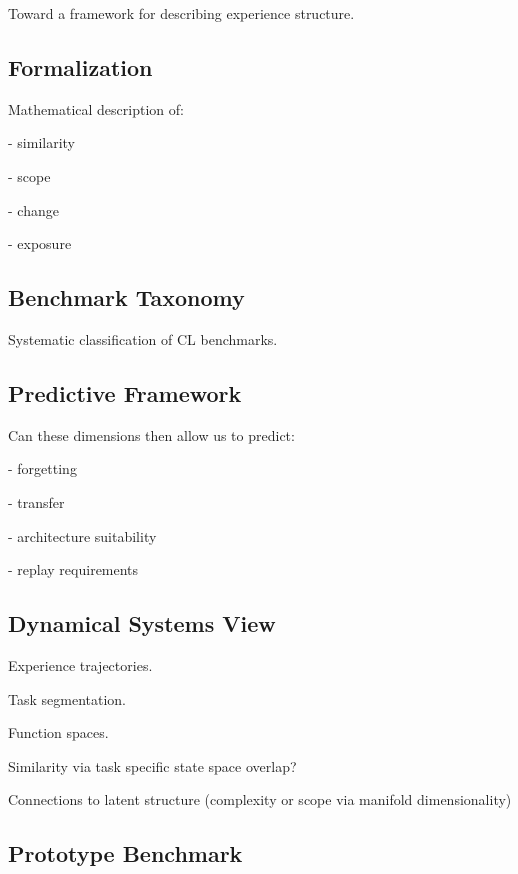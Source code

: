 \documentclass{article}
\begin{document}
        Toward a framework for describing experience structure.
        
        \subsection{Formalization}
        
            Mathematical description of:
            
            - similarity
            
            - scope
            
            - change
            
            - exposure
        
        \subsection{Benchmark Taxonomy}
        
            Systematic classification of CL benchmarks.
        
        \subsection{Predictive Framework}
        
            Can these dimensions then allow us to predict:
            
            - forgetting
            
            - transfer
            
            - architecture suitability
            
            - replay requirements

        
        \subsection{Dynamical Systems View}
        
            Experience trajectories.
            
            Task segmentation.
            
            Function spaces.

            Similarity via task specific state space overlap?
            
            Connections to latent structure (complexity or scope via manifold dimensionality)
        
        \subsection{Prototype Benchmark}
        
\end{document}
